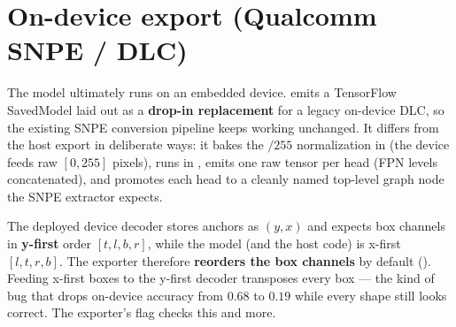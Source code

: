 \section{On-device export (Qualcomm SNPE / DLC)}
The model ultimately runs on an embedded device. 
emits a TensorFlow SavedModel laid out as a \textbf{drop-in replacement} for a legacy
on-device DLC, so the existing SNPE conversion pipeline keeps working unchanged. It differs
from the host export in deliberate ways: it bakes the $/255$ normalization in (the device
feeds raw $[0,255]$ pixels), runs in , emits one raw tensor per head (FPN
levels concatenated), and promotes each head to a cleanly named top-level graph node the
SNPE extractor expects.

\begin{pitfall}
The deployed device decoder stores anchors as $(y,x)$ and expects box channels in
\textbf{y-first} order $[t,l,b,r]$, while the model (and the host code) is x-first
$[l,t,r,b]$. The exporter therefore \textbf{reorders the box channels} by default
(). Feeding x-first boxes to the y-first decoder transposes
every box --- the kind of bug that drops on-device accuracy from $0.68$ to $0.19$ while
every shape still looks correct. The exporter's  flag checks this and more.
\end{pitfall}

